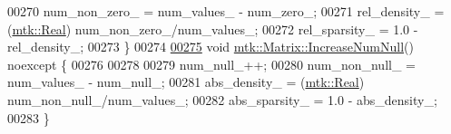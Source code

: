 \begin{DoxyCode}
00270   num\_non\_zero\_ = num\_values\_ - num\_zero\_;
00271   rel\_density\_ = (\hyperlink{group__c01-roots_gac080bbbf5cbb5502c9f00405f894857d}{mtk::Real}) num\_non\_zero\_/num\_values\_;
00272   rel\_sparsity\_ = 1.0 - rel\_density\_;
00273 \}
00274 
\hypertarget{mtk__matrix_8cc_source_l00275}{}\hyperlink{classmtk_1_1Matrix_af4bba5c43d1f09f5059a04298ba24568}{00275} \textcolor{keywordtype}{void} \hyperlink{classmtk_1_1Matrix_af4bba5c43d1f09f5059a04298ba24568}{mtk::Matrix::IncreaseNumNull}() noexcept \{
00276 
00278 
00279   num\_null\_++;
00280   num\_non\_null\_ = num\_values\_ - num\_null\_;
00281   abs\_density\_ = (\hyperlink{group__c01-roots_gac080bbbf5cbb5502c9f00405f894857d}{mtk::Real}) num\_non\_null\_/num\_values\_;
00282   abs\_sparsity\_ = 1.0 - abs\_density\_;
00283 \}
\end{DoxyCode}
